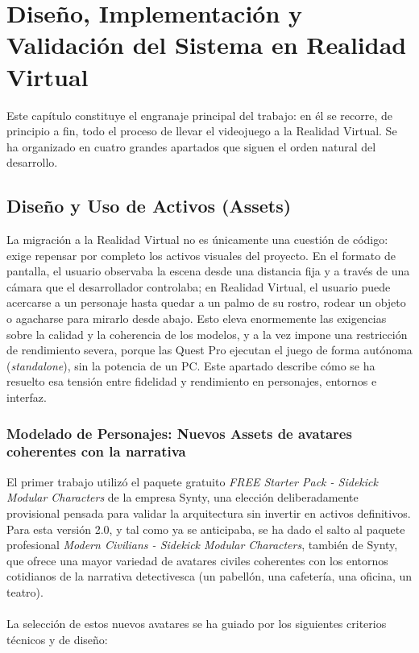 \documentclass[12pt,twoside,titlepage]{report}
\begin{document}
\chapter{Diseño, Implementación y Validación del Sistema en Realidad Virtual}

Este capítulo constituye el engranaje principal del trabajo: en él se recorre, de principio a fin, todo el proceso de llevar el videojuego a la Realidad Virtual.
Se ha organizado en cuatro grandes apartados que siguen el orden natural del desarrollo.

\section{Diseño y Uso de Activos (Assets)}
\label{sec:assets}

La migración a la Realidad Virtual no es únicamente una cuestión de código: exige repensar por completo los activos visuales del proyecto.
En el formato de pantalla, el usuario observaba la escena desde una distancia fija y a través de una cámara que el desarrollador controlaba; en Realidad Virtual, el usuario puede acercarse a un personaje hasta quedar a un palmo de su rostro, rodear un objeto o agacharse para mirarlo desde abajo.
Esto eleva enormemente las exigencias sobre la calidad y la coherencia de los modelos, y a la vez impone una restricción de rendimiento severa, porque las Quest Pro ejecutan el juego de forma autónoma (\textit{standalone}), sin la potencia de un PC.
Este apartado describe cómo se ha resuelto esa tensión entre fidelidad y rendimiento en personajes, entornos e interfaz.

\subsection{Modelado de Personajes: Nuevos Assets de avatares coherentes con la narrativa}

El primer trabajo utilizó el paquete gratuito \textit{FREE Starter Pack - Sidekick Modular Characters} de la empresa Synty, una elección deliberadamente provisional pensada para validar la arquitectura sin invertir en activos definitivos.
Para esta versión 2.0, y tal como ya se anticipaba, se ha dado el salto al paquete profesional \textit{Modern Civilians - Sidekick Modular Characters}, también de Synty, que ofrece una mayor variedad de avatares civiles coherentes con los entornos cotidianos de la narrativa detectivesca (un pabellón, una cafetería, una oficina, un teatro).\\
\\
La selección de estos nuevos avatares se ha guiado por los siguientes criterios técnicos y de diseño:
\end{document}
